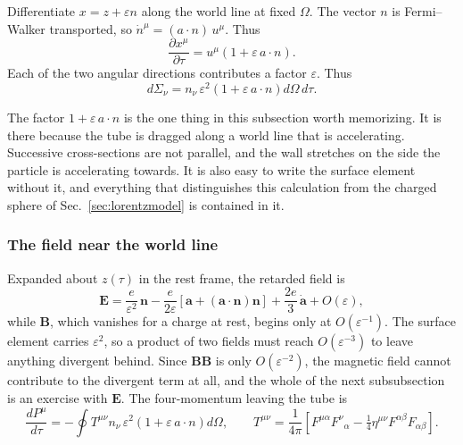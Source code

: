 \documentclass[preprint]{aastex701}
\begin{document}
Differentiate $x = z + \varepsilon n$ along the world line at fixed $\Omega$.
The vector $n$ is Fermi--Walker transported, so
$\dot n^\mu = (a\cdot n)\,u^\mu$. Thus
\begin{equation}
\frac{\partial x^\mu}{\partial\tau} = u^\mu\left(1 + \varepsilon\,a\cdot n\right).
\label{eq:tubetilt}
\end{equation}
Each of the two angular directions contributes a factor $\varepsilon$. Thus
\begin{equation}
d\Sigma_\nu = n_\nu\,\varepsilon^2
\left(1 + \varepsilon\,a\cdot n\right) d\Omega\,d\tau .
\label{eq:tubeelement}
\end{equation}

The factor $1 + \varepsilon\,a\cdot n$ is the one thing in this subsection worth
memorizing. It is there because the tube is dragged along a world line that is
accelerating. Successive cross-sections are not parallel, and the wall stretches
on the side the particle is accelerating towards. It is also easy to write the
surface element without it, and everything that distinguishes this calculation
from the charged sphere of Sec.~\ref{sec:lorentzmodel} is contained in it.

\subsubsection{The field near the world line}
\label{sec:nearfield}

Expanded about $z(\tau)$ in the rest frame, the retarded field is
\begin{equation}
\mathbf E = \frac{e}{\varepsilon^2}\,\mathbf n
- \frac{e}{2\varepsilon}\left[\mathbf a + (\mathbf a\cdot\mathbf n)\mathbf n\right]
+ \frac{2e}{3}\,\dot{\mathbf a} + O(\varepsilon),
\label{eq:nearfield}
\end{equation}
while $\mathbf B$, which vanishes for a charge at rest, begins only at
$O(\varepsilon^{-1})$. The surface element carries $\varepsilon^2$, so a product
of two fields must reach $O(\varepsilon^{-3})$ to leave anything divergent
behind. Since $\mathbf{BB}$ is only $O(\varepsilon^{-2})$, the magnetic field
cannot contribute to the divergent term at all, and the whole of the next
subsubsection is an exercise with $\mathbf E$. The four-momentum leaving the
tube is
\begin{equation}
\frac{dP^\mu}{d\tau} = -\oint T^{\mu\nu} n_\nu\,
\varepsilon^2\left(1+\varepsilon\,a\cdot n\right)d\Omega ,
\qquad
T^{\mu\nu} = \frac{1}{4\pi}
\left[F^{\mu\alpha}F^{\nu}{}_{\alpha}
- \tfrac14\eta^{\mu\nu}F^{\alpha\beta}F_{\alpha\beta}\right].
\label{eq:fluxdef}
\end{equation}
\end{document}
